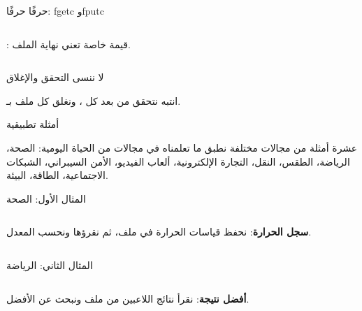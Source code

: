 \documentclass[aspectratio=169, 11pt, t, xcolor={table}]{beamer}
\begin{document}
\begin{frame}[t]{حرفًا حرفًا: \textenglish{fgetc} و\textenglish{fputc}}
    \begin{columns}[T]
        {\small {}: قيمة خاصة تعني نهاية الملف.\par}
        \vspace{0.3cm}
    \end{columns}
\end{frame}

\begin{frame}{لا ننسى التحقق والإغلاق}
    \begin{center}
    \begin{minipage}{0.7\textwidth}
    \end{minipage}
    \end{center}
    \begin{obox}{\faExclamationTriangle\quad انتبه}
        نتحقق من  بعد كل ، ونغلق كل ملف بـ.
    \end{obox}
\end{frame}

\begin{frame}{أمثلة تطبيقية}
    \begin{tbox}{\faLaptopCode\quad عشرة أمثلة من مجالات مختلفة}
        نطبق ما تعلمناه في مجالات من الحياة اليومية:
        الصحة، الرياضة، الطقس، النقل، التجارة الإلكترونية، ألعاب الفيديو، الأمن السيبراني، الشبكات الاجتماعية، الطاقة، البيئة.
    \end{tbox}
\end{frame}

\begin{frame}[t]{المثال الأول: الصحة}
    \begin{columns}[T]
        {\small \textbf{سجل الحرارة}: نحفظ قياسات الحرارة في ملف، ثم نقرؤها ونحسب المعدل.\par}
        \vspace{0.3cm}
    \end{columns}
\end{frame}

\begin{frame}[t]{المثال الثاني: الرياضة}
    \begin{columns}[T]
        {\small \textbf{أفضل نتيجة}: نقرأ نتائج اللاعبين من ملف ونبحث عن الأفضل.\par}
        \vspace{0.3cm}
    \end{columns}
\end{frame}
\end{document}
